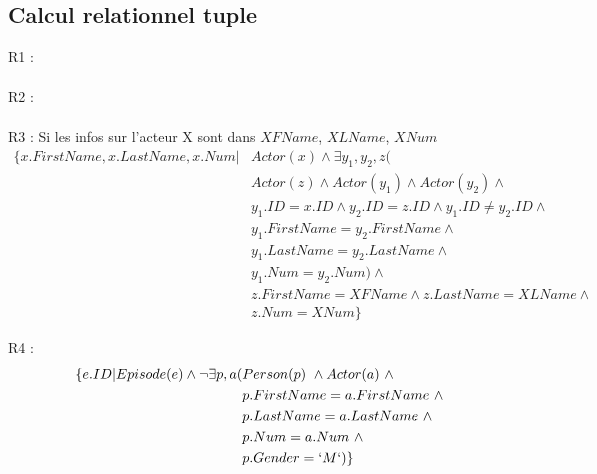\documentclass[a4paper,12pt]{article}
\begin{document}
\subsection{Calcul relationnel tuple}
\begin{list}{-}{}
  \item R1 :
    \begin{align*}
    \end{align*}
  \item R2 :
    \begin{align*}
    \end{align*}
  \item R3 :
    Si les infos sur l'acteur X sont dans $XFName$, $XLName$, $XNum$
    \begin{align*}
      \{ x.FirstName, x.LastName, x.Num | &Actor(x) \wedge \exists y_1, y_2, z ( \\
      &Actor(z) \wedge Actor(y_1) \wedge Actor(y_2) \wedge \\
      &y_1.ID = x.ID \wedge y_2.ID = z.ID \wedge y_1.ID \neq y_2.ID \wedge\\
      &y_1.FirstName = y_2.FirstName \wedge \\
      &y_1.LastName = y_2.LastName \wedge \\
      &y_1.Num = y_2.Num) \wedge \\
      &z.FirstName = XFName \wedge z.LastName = XLName \wedge \\
      &z.Num = XNum\}
    \end{align*}
  \item R4 :
    \begin{align*}
      \{ e.ID | Episode(e) \wedge \lnot \exists p, a (&Person(p) ~\wedge Actor(a) ~\wedge \\
        & p.FirstName = a.FirstName ~\wedge \\
        & p.LastName = a.LastName ~\wedge \\
        & p.Num = a.Num ~\wedge \\
        & p.Gender = `M`)\}
    \end{align*}
\end{list}
          
\end{document}
